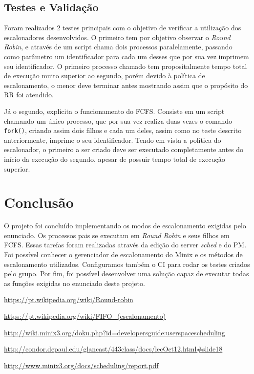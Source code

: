 \documentclass[12pt,journal,compsoc]{IEEEtran}
\begin{document}
\subsection{Testes e Validação}
	Foram realizados 2 testes principais com o objetivo de verificar a utilização dos escalonadores desenvolvidos. O primeiro tem por objetivo observar o \textit{Round Robin}, e através de um script chama dois processos paralelamente, passando como parâmetro um identificador para cada um desses que por sua vez imprimem seu identificador. O primeiro processo chamado tem propositalmente tempo total de execução muito superior ao segundo, porém devido à política de escalonamento, o menor deve terminar antes mostrando assim que o propósito do RR foi atendido.
   
   Já o segundo, explicita o funcionamento do FCFS. Consiste em um script chamando um único processo, que por sua vez realiza duas vezes o comando \texttt{fork()}, criando assim dois filhos e cada um deles, assim como no teste descrito anteriormente, imprime o seu identificador. Tendo em vista a política do escalonador, o primeiro a ser criado deve ser executado completamente antes do início da execução do segundo, apesar de possuir tempo total de execução superior.


\section{Conclusão}
	O projeto foi concluído implementando os modos de escalonamento exigidas pelo enunciado. Os processos pais se executam em \textit{Round Robin} e seus filhos em FCFS. Essas tarefas foram realizadas através da edição do server \textit{sched} e do PM. Foi possível conhecer o gerenciador de escalonamento do Minix e os métodos de escalonamento utilizados. Configuramos também o CI para rodar os testes criados pelo grupo. Por fim, foi possível desenvolver uma solução capaz de executar todas as funções exigidas no enunciado deste projeto.

\renewcommand\refname{Referências}
\begin{thebibliography}{1}

\url{https://pt.wikipedia.org/wiki/Round-robin}

\url{https://pt.wikipedia.org/wiki/FIFO_(escalonamento)}

\url{http://wiki.minix3.org/doku.php?id=developersguide:userspacescheduling}

\url{http://condor.depaul.edu/glancast/443class/docs/lecOct12.html#slide18}

\url{http://www.minix3.org/docs/scheduling/report.pdf }


\end{thebibliography}
\end{document}
